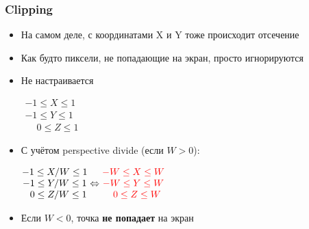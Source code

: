 \documentclass[10pt]{beamer}
\begin{document}
\begin{frame}[fragile]
\frametitle{Clipping}
\begin{itemize}
\item На самом деле, с координатами X и Y тоже происходит отсечение
\pause
\item Как будто пиксели, не попадающие на экран, просто игнорируются
\pause
\item Не настраивается
\pause

\begin{center}
\begin{math}
\begin{matrix}
-1 \leq X \leq 1 \\
-1 \leq Y \leq 1 \\
\phantom{-}0 \leq Z \leq 1
\end{matrix}
\end{math}
\end{center}

\pause
\item С учётом perspective divide (если \begin{math}W>0\end{math}):

\begin{center}
\begin{math}
\begin{matrix}
-1 \leq X/W \leq 1 \\
-1 \leq Y/W \leq 1 \\
\phantom{-}0 \leq Z/W \leq 1
\end{matrix}
\Leftrightarrow
\color{red}
\begin{matrix}
-W \leq X \leq W \\
-W \leq Y \leq W \\
\phantom{-}0 \leq Z \leq W
\end{matrix}
\end{math}
\end{center}

\pause
\item Если \begin{math}W<0\end{math}, точка \textbf{\alert{не попадает}} на экран
\end{itemize}

\end{frame}
\end{document}
